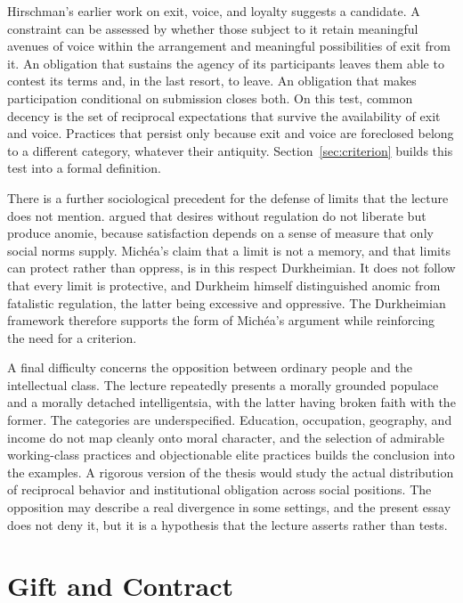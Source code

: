 \documentclass[12pt]{article}
\begin{document}
Hirschman's earlier work on exit, voice, and loyalty \citep{hirschman70} suggests a candidate. A constraint can be assessed by whether those subject to it retain meaningful avenues of voice within the arrangement and meaningful possibilities of exit from it. An obligation that sustains the agency of its participants leaves them able to contest its terms and, in the last resort, to leave. An obligation that makes participation conditional on submission closes both. On this test, common decency is the set of reciprocal expectations that survive the availability of exit and voice. Practices that persist only because exit and voice are foreclosed belong to a different category, whatever their antiquity. Section~\ref{sec:criterion} builds this test into a formal definition.

There is a further sociological precedent for the defense of limits that the lecture does not mention. \citet{durkheim} argued that desires without regulation do not liberate but produce anomie, because satisfaction depends on a sense of measure that only social norms supply. Michéa's claim that a limit is not a memory, and that limits can protect rather than oppress, is in this respect Durkheimian. It does not follow that every limit is protective, and Durkheim himself distinguished anomic from fatalistic regulation, the latter being excessive and oppressive. The Durkheimian framework therefore supports the form of Michéa's argument while reinforcing the need for a criterion.

A final difficulty concerns the opposition between ordinary people and the intellectual class. The lecture repeatedly presents a morally grounded populace and a morally detached intelligentsia, with the latter having broken faith with the former. The categories are underspecified. Education, occupation, geography, and income do not map cleanly onto moral character, and the selection of admirable working-class practices and objectionable elite practices builds the conclusion into the examples. A rigorous version of the thesis would study the actual distribution of reciprocal behavior and institutional obligation across social positions. The opposition may describe a real divergence in some settings, and the present essay does not deny it, but it is a hypothesis that the lecture asserts rather than tests.

\section{Gift and Contract}
\label{sec:gift}
\end{document}
